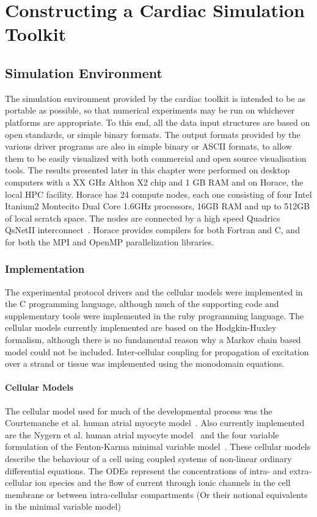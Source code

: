 \chapter{Constructing a Cardiac Simulation Toolkit}

\section{Simulation Environment}

The simulation environment provided by the cardiac toolkit is intended to be as
portable as possible, so that numerical experiments may be run on whichever
platforms are appropriate.  To this end, all the data input structures are based
on open standards, or simple binary formats.  The output formats provided by the
various driver programs are also in simple binary or ASCII formats, to allow
them to be easily visualized with both commercial and open source visualisation
tools.  The results presented later in this chapter were performed on desktop
computers with a XX GHz Althon X2 chip and 1 GB RAM and on Horace, the local HPC
facility.  Horace has 24 compute nodes, each one consisting of four Intel Itanium2
Montecito Dual Core 1.6GHz processors, 16GB RAM and up to 512GB of local scratch
space.  The nodes are connected by a high speed Quadrics QsNetII
interconnect~\cite{horace}.  Horace provides compilers for both Fortran and C,
and for both the MPI and OpenMP parallelization libraries.

\subsection{Implementation}

The experimental protocol drivers and the cellular models were implemented in
the C programming language, although much of the supporting code and
supplementary tools were implemented in the ruby programming language.  The
cellular models currently implemented are based on the Hodgkin-Huxley formalism,
although there is no fundamental reason why a Markov chain based model could not
be included.  Inter-cellular coupling for propagation of excitation over a
strand or tissue was implemented using the monodomain equations.

\subsubsection{Cellular Models}

The cellular model used for much of the developmental process was the
Courtemanche et al. human atrial myocyte model~\cite{crn98}.  Also currently
implemented are the Nygern et al. human atrial myocyte model~\cite{nygern98} and
the four variable formulation of the Fenton-Karma minimal variable
model~\cite{overo2008}.  These cellular models describe the behaviour of a cell
using coupled systems of non-linear ordinary differential equations.  The ODEs
represent the concentrations of intra- and extra-cellular ion species and the
flow of current through ionic channels in the cell membrane or between
intra-cellular compartments (Or their notional equivalents in the minimal
variable model)

